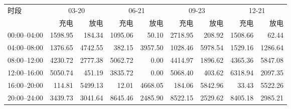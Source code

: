 \begin{tabular}{lrrrrrrrr}
\toprule
\multirow{2}{*}{时段} & \multicolumn{2}{c}{03-20} & \multicolumn{2}{c}{06-21} & \multicolumn{2}{c}{09-23} & \multicolumn{2}{c}{12-21} \\
 & 充电 & 放电 & 充电 & 放电 & 充电 & 放电 & 充电 & 放电 \\
\midrule
00:00--04:00 & 1598.95 & 184.34 & 1095.06 & 50.10 & 2718.95 & 208.92 & 1508.66 & 62.44 \\
04:00--08:00 & 1376.65 & 4742.55 & 382.15 & 3957.50 & 1028.46 & 5978.54 & 1529.16 & 1286.64 \\
08:00--12:00 & 4230.72 & 2777.38 & 5062.72 & 0.00 & 4414.97 & 1896.62 & 4365.36 & 5847.08 \\
12:00--16:00 & 5050.74 & 451.19 & 3835.72 & 0.00 & 5068.40 & 403.62 & 6318.94 & 2097.35 \\
16:00--20:00 & 114.81 & 5499.13 & 12.01 & 4668.05 & 184.06 & 5842.96 & 33.43 & 5522.26 \\
20:00--24:00 & 3439.73 & 3041.64 & 8645.46 & 2485.90 & 8522.15 & 2529.62 & 8405.18 & 2985.21 \\
\bottomrule
\end{tabular}